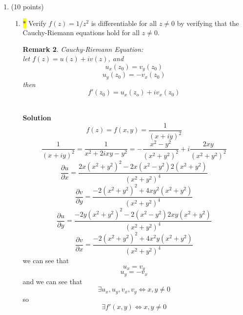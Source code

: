 \documentclass[12pt]{article}
\newtheorem*{remark}{Remark}
\begin{document}
\begin{enumerate}
\begin{enumerate}
\begin{remark}
\end{remark}

\item  Let $f(z) = \frac{\bar{z}^{2}}{z}$ when $z \neq 0$ and $f(0) = 0$.  Use the definition of the derivative to show that $f$ is not differentiable at the origin. 
\end{enumerate}

\textbf{Solution:}
\\let $\Bar{z}=x-iy$, we have\[
f'(z)=\lim_{h\to 0} \frac{f(h)-f(0)}{h}
\]
we know $f(0) = 0$, hence this can be simplified as \[
\lim_{h\to 0} \frac{\Bar{h}^2}{h^2} = \lim_{h\to 0} (\frac{\Bar{h}}{h})^2
\]
evaluate $\lim_{h\to 0} \frac{\Bar{h}}{h}$,\[
\text{let $h=re^{i\theta}$}
\]
\[
\text{approach this limit from its exponential form}
\]\[
\lim_{r\to 0} (\frac{re^{-i\theta}}{re^{i\theta}})^2 = e^{-4i\theta}
\]
we can see how this limit can be a wide range of complex number by varying the parameter $\theta$, hence the limit does not exist\\
therefore this derivative does not exist


\item (10 points) 
\begin{enumerate}
    \item \colorbox{yellow}{$\ast$} Verify $f(z) = 1/z^{2}$ is differentiable for all $z \neq 0$ by verifying that the Cauchy-Riemann equations hold for all $z \neq 0$.  
\begin{remark}
    Cauchy-Riemann Equation:\\
    let $f(z)=u(z)+iv(z)$, and\[
    u_x(z_0)=v_y(z_0)
    \]\[
    u_y(z_0)=-v_x(z_0)
    \]then\[
    f'(z_0)=u_x(z_o)+iv_x(z_0)
    \]
\end{remark}\\
\textbf{Solution}
\\
\[
f(z)=f(x,y)=\frac{1}{(x+iy)^2}
\]
\[
\frac{1}{(x+iy)^2}=\frac{1}{x^2+2ixy-y^2}=-\frac{x^2 - y^2}{(x^2 + y^2)^2} + i\frac{2xy}{(x^2 + y^2)^2}
\]
\[
\frac{\partial u}{\partial x} = \frac{2x(x^2 + y^2)^2 - 2x(x^2 - y^2)2(x^2 + y^2)}{(x^2 + y^2)^4}
\]\[
\frac{\partial v}{\partial y} = \frac{-2(x^2 + y^2)^2 + 4xy^2(x^2 + y^2)}{(x^2 + y^2)^4}
\]\[
\frac{\partial u}{\partial y} = \frac{-2y(x^2 + y^2)^2 - 2(x^2 - y^2)2xy(x^2 + y^2)}{(x^2 + y^2)^4}
\]\[
\frac{\partial v}{\partial x} = \frac{-2(x^2 + y^2)^2 + 4x^2y(x^2 + y^2)}{(x^2 + y^2)^4}
\]
we can see that\[
u_x=v_y
\]
\[
u_y=-v_x
\]
and we can see that\[
\exists u_x, u_y, v_x, v_y \iff x,y\neq 0
\]
so\[
\exists f'(x,y) \iff x,y \neq 0
\]
    

\end{enumerate}
\end{enumerate}
\end{document}
